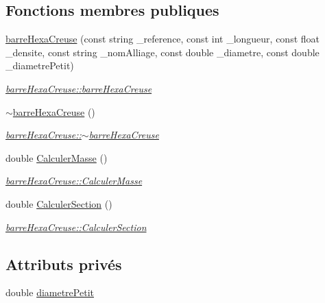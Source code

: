 \subsection*{Fonctions membres publiques}
\begin{DoxyCompactItemize}
\item 
\hyperlink{classbarre_hexa_creuse_a0da420fa29dd2b947661958729f1f0d7}{barre\+Hexa\+Creuse} (const string \+\_\+reference, const int \+\_\+longueur, const float \+\_\+densite, const string \+\_\+nom\+Alliage, const double \+\_\+diametre, const double \+\_\+diametre\+Petit)
\begin{DoxyCompactList}\small\item\em \hyperlink{classbarre_hexa_creuse_a0da420fa29dd2b947661958729f1f0d7}{barre\+Hexa\+Creuse\+::barre\+Hexa\+Creuse} \end{DoxyCompactList}\item 
\hyperlink{classbarre_hexa_creuse_a5b51540579b5268f23dbcf8e5db04458}{$\sim$barre\+Hexa\+Creuse} ()
\begin{DoxyCompactList}\small\item\em \hyperlink{classbarre_hexa_creuse_a5b51540579b5268f23dbcf8e5db04458}{barre\+Hexa\+Creuse\+::$\sim$barre\+Hexa\+Creuse} \end{DoxyCompactList}\item 
double \hyperlink{classbarre_hexa_creuse_a0d524ad6862407dc9128c7163b22a0ca}{Calculer\+Masse} ()
\begin{DoxyCompactList}\small\item\em \hyperlink{classbarre_hexa_creuse_a0d524ad6862407dc9128c7163b22a0ca}{barre\+Hexa\+Creuse\+::\+Calculer\+Masse} \end{DoxyCompactList}\item 
double \hyperlink{classbarre_hexa_creuse_a205ab8a47da16cd0eb63770bcd911b90}{Calculer\+Section} ()
\begin{DoxyCompactList}\small\item\em \hyperlink{classbarre_hexa_creuse_a205ab8a47da16cd0eb63770bcd911b90}{barre\+Hexa\+Creuse\+::\+Calculer\+Section} \end{DoxyCompactList}\end{DoxyCompactItemize}
\subsection*{Attributs privés}
\begin{DoxyCompactItemize}
\item 
double \hyperlink{classbarre_hexa_creuse_a9d3319db26ff56f7b27c374535a89a6d}{diametre\+Petit}
\end{DoxyCompactItemize}
